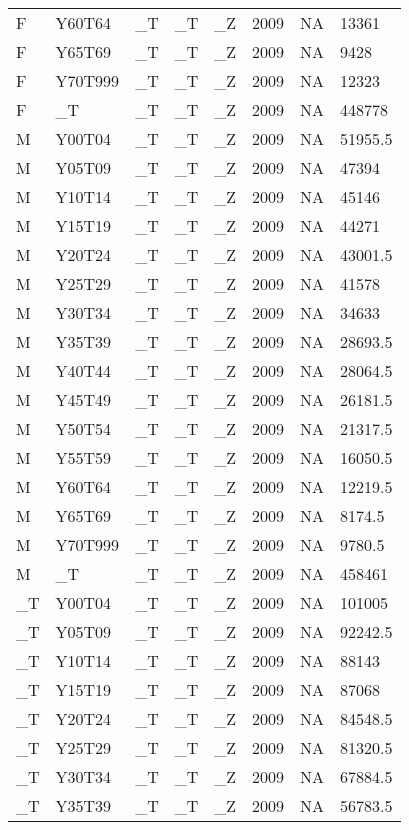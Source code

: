 \begin{longtable}[t]{llllllll}
F & Y60T64 & \_T & \_T & \_Z & 2009 & NA & 13361\\
F & Y65T69 & \_T & \_T & \_Z & 2009 & NA & 9428\\
F & Y70T999 & \_T & \_T & \_Z & 2009 & NA & 12323\\
F & \_T & \_T & \_T & \_Z & 2009 & NA & 448778\\
M & Y00T04 & \_T & \_T & \_Z & 2009 & NA & 51955.5\\
\addlinespace
M & Y05T09 & \_T & \_T & \_Z & 2009 & NA & 47394\\
M & Y10T14 & \_T & \_T & \_Z & 2009 & NA & 45146\\
M & Y15T19 & \_T & \_T & \_Z & 2009 & NA & 44271\\
M & Y20T24 & \_T & \_T & \_Z & 2009 & NA & 43001.5\\
M & Y25T29 & \_T & \_T & \_Z & 2009 & NA & 41578\\
\addlinespace
M & Y30T34 & \_T & \_T & \_Z & 2009 & NA & 34633\\
M & Y35T39 & \_T & \_T & \_Z & 2009 & NA & 28693.5\\
M & Y40T44 & \_T & \_T & \_Z & 2009 & NA & 28064.5\\
M & Y45T49 & \_T & \_T & \_Z & 2009 & NA & 26181.5\\
M & Y50T54 & \_T & \_T & \_Z & 2009 & NA & 21317.5\\
\addlinespace
M & Y55T59 & \_T & \_T & \_Z & 2009 & NA & 16050.5\\
M & Y60T64 & \_T & \_T & \_Z & 2009 & NA & 12219.5\\
M & Y65T69 & \_T & \_T & \_Z & 2009 & NA & 8174.5\\
M & Y70T999 & \_T & \_T & \_Z & 2009 & NA & 9780.5\\
M & \_T & \_T & \_T & \_Z & 2009 & NA & 458461\\
\addlinespace
\_T & Y00T04 & \_T & \_T & \_Z & 2009 & NA & 101005\\
\_T & Y05T09 & \_T & \_T & \_Z & 2009 & NA & 92242.5\\
\_T & Y10T14 & \_T & \_T & \_Z & 2009 & NA & 88143\\
\_T & Y15T19 & \_T & \_T & \_Z & 2009 & NA & 87068\\
\_T & Y20T24 & \_T & \_T & \_Z & 2009 & NA & 84548.5\\
\addlinespace
\_T & Y25T29 & \_T & \_T & \_Z & 2009 & NA & 81320.5\\
\_T & Y30T34 & \_T & \_T & \_Z & 2009 & NA & 67884.5\\
\_T & Y35T39 & \_T & \_T & \_Z & 2009 & NA & 56783.5\\

\end{longtable}

